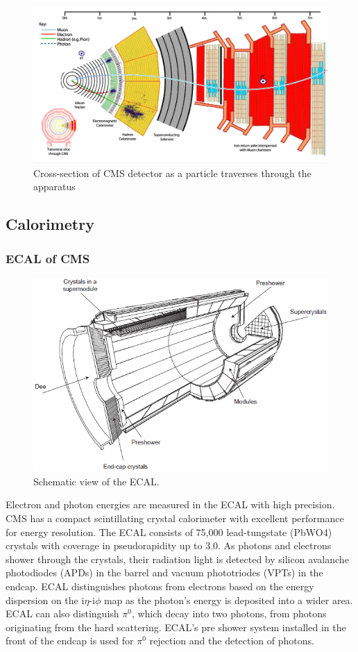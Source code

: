 \begin{figure}[h!]
  \caption{Cross-section of CMS detector as a particle traverses through the apparatus \cite{xsec}}
  \label{fig:cmsxsec}
  \centering
  \includegraphics[width=0.87\linewidth]{figs/cmsxsec.png}
\end{figure}
\subsection{Calorimetry}
\subsubsection{ECAL of CMS}
\begin{figure}[h!]
  \caption{Schematic view of the ECAL. \cite{ecal}}
  \label{fig:ECAL}
  \centering
  \includegraphics[width=0.87\linewidth]{figs/ECAL.png}
\end{figure}
Electron and photon energies are measured in the ECAL with high precision. 
CMS has a compact scintillating crystal calorimeter with excellent performance for energy resolution. 
The ECAL consists of 75,000 lead-tungstate (PbWO4) crystals with coverage in pseudorapidity up to 3.0. As photons and electrons shower through the crystals, their radiation light is detected by silicon avalanche photodiodes (APDs) in the barrel and vacuum phototriodes (VPTs) in the endcap.
ECAL distinguishes photons from electrons based on the energy dispersion on the i$\eta$-i$\phi$ map as the photon's energy is deposited into a wider area.
ECAL can also distinguish $\pi^{0}$, which decay into two photons, from photons originating from the hard scattering.
ECAL's pre shower system installed in the front of the endcap is used for $\pi^{0}$ rejection and the detection of photons.

